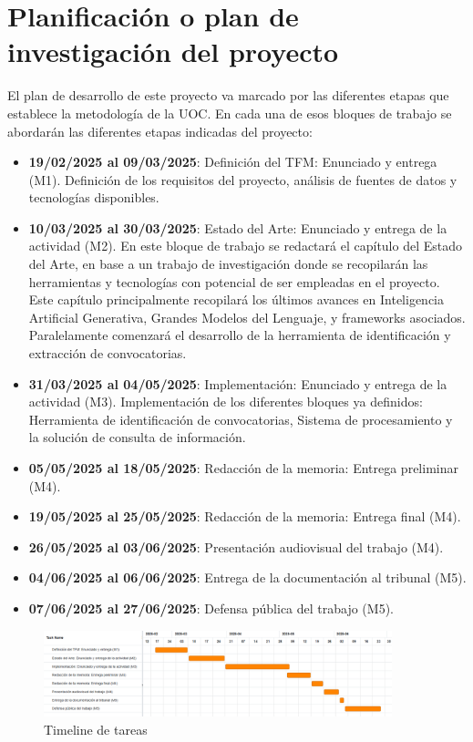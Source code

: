 \begin{itemize}
\begin{itemize}
\end{itemize}


\end{itemize}

\newpage

\section{Planificación o plan de investigación del proyecto}

El plan de desarrollo de este proyecto va marcado por las diferentes etapas que establece la metodología de la UOC.
En cada una de esos bloques de trabajo se abordarán las diferentes etapas indicadas del proyecto:

\begin{itemize}
    \item \textbf{19/02/2025 al 09/03/2025}:
    Definición del TFM: Enunciado y entrega (M1).
    Definición de los requisitos del proyecto, análisis de fuentes de datos y tecnologías disponibles.
    \item \textbf{10/03/2025 al 30/03/2025}:
    Estado del Arte: Enunciado y entrega de la actividad (M2). 
    En este bloque de trabajo se redactará el capítulo del Estado del Arte, en base a un trabajo de investigación donde se recopilarán las herramientas y tecnologías con potencial de ser empleadas en el proyecto.
    Este capítulo principalmente recopilará los últimos avances en Inteligencia Artificial Generativa, Grandes Modelos del Lenguaje, y frameworks asociados.
    Paralelamente comenzará el desarrollo de la herramienta de identificación y extracción de convocatorias.
    \item \textbf{31/03/2025 al 04/05/2025}:
    Implementación: Enunciado y entrega de la actividad (M3).
    Implementación de los diferentes bloques ya definidos: Herramienta de identificación de convocatorias, Sistema de procesamiento y la solución de consulta de información.
    \item \textbf{05/05/2025 al 18/05/2025}:
    Redacción de la memoria: Entrega preliminar (M4).
    \item \textbf{19/05/2025 al 25/05/2025}:
    Redacción de la memoria: Entrega final (M4).
    \item \textbf{26/05/2025 al 03/06/2025}:
    Presentación audiovisual del trabajo (M4).
    \item \textbf{04/06/2025 al 06/06/2025}:
    Entrega de la documentación al tribunal (M5).
    \item \textbf{07/06/2025 al 27/06/2025}:
    Defensa pública del trabajo (M5).
\end{itemize}

\begin{figure}[h]
	\centering
	\includegraphics[width=0.9\textwidth]{figs/gantt.png}
	\caption{Timeline de tareas}
	\label{fig:context-anoni1}
\end{figure}

